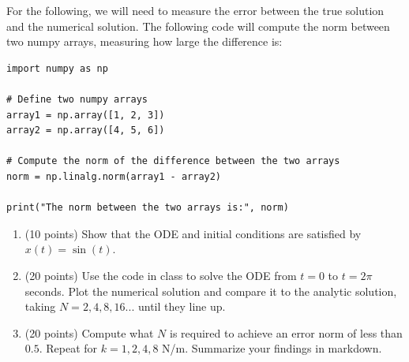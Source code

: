 \documentclass[12pt]{article}
\begin{document}
For the following, we will need to measure the error between the true solution and the numerical solution. The following code will compute the norm between two numpy arrays, measuring how large the difference is:

\begin{verbatim}
import numpy as np

# Define two numpy arrays
array1 = np.array([1, 2, 3])
array2 = np.array([4, 5, 6])

# Compute the norm of the difference between the two arrays
norm = np.linalg.norm(array1 - array2)

print("The norm between the two arrays is:", norm)
\end{verbatim}

\begin{enumerate}[label=(\alph*)]
    \item (10 points) Show that the ODE and initial conditions are satisfied by $x(t) = \sin(t)$.
    \item (20 points) Use the code in class to solve the ODE from $t=0$ to $t = 2 \pi$ seconds. Plot the numerical solution and compare it to the analytic solution, taking $N = 2,4,8,16...$ until they line up.
    \item (20 points) Compute what $N$ is required to achieve an error norm of less than $0.5$. Repeat for $k = 1,2,4,8$ N/m. Summarize your findings in markdown.
\end{enumerate}
\end{document}

